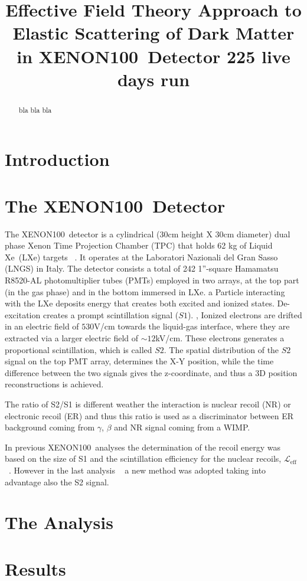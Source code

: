\documentclass[twocolumn, showpacs, showkeys, amsmath, amssymb, floatfix]{revtex4}
\newcommand \Leff{$\mathcal{L}_{\mathrm{eff}}$}
\newcommand{\Xehund}{{XENON100}}
\newcommand{\Xe}{{\sc Xe}}
\begin{document}
\linenumbers 

\title{Effective Field Theory Approach to Elastic Scattering of Dark Matter in  \Xehund\ Detector 225 live days run}
%


\begin{abstract} 

bla bla bla

\end{abstract}

\pacs{}

\maketitle 
\section{Introduction}
\section{The \Xehund\  Detector}
The \Xehund\ detector is a cylindrical (30cm height X 30cm diameter) dual phase Xenon Time Projection Chamber (TPC) that holds 62 kg of Liquid \Xe\ (LXe) targets ~\cite{xe100_instr2012}. It operates at the Laboratori Nazionali del Gran Sasso (LNGS) in Italy. The detector consists a total of 242 1”-square Hamamatsu R8520-AL photomultiplier tubes (PMTs) employed in two arrays, at the top part (in the gas phase) and in the bottom immersed in LXe. a Particle interacting with the LXe deposits energy that creates both excited and ionized states. De-excitation creates a prompt scintillation signal ($S1$). ,  Ionized electrons are drifted in an electric field of $530$V/cm towards the liquid-gas interface, where they are extracted via a larger electric field of $\sim12$kV/cm. These electrons generates a proportional scintillation, which is called $S2$. The spatial distribution of the $S2$ signal on the top PMT array, determines the X-Y position, while the time difference between the two signals gives the z-coordinate, and thus a 3D position reconstructions is achieved.

The ratio of S2/S1 is different weather the interaction is nuclear recoil (NR) or electronic recoil (ER) and thus this ratio is used as a discriminator between ER background coming from $\gamma$, $\beta$ and NR signal coming from a WIMP. 

In previous \Xehund\ analyses the determination of the recoil energy was based on the size of S1 and the scintillation efficiency for the nuclear recoils, \Leff ~\cite{xe100_run10_si}. However in the last analysis ~\cite{xe100_run_combination} a new method was adopted taking into advantage also the S2 signal.
      

\section{The Analysis}
\section{Results}







\end{document}
